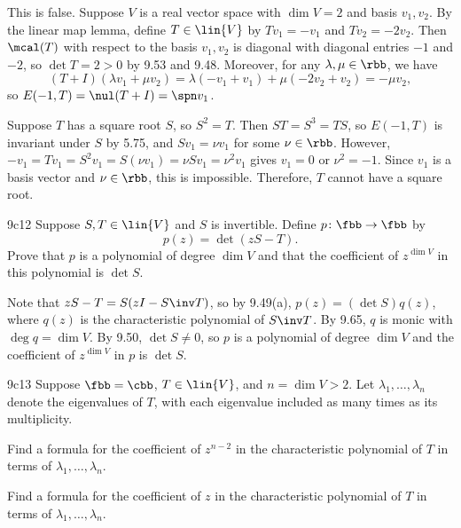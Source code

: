 \begin{sol}
    This is false.
    Suppose $V$ is a real vector space with $\dim V = 2$ and basis $v_1, v_2$.
    By the linear map lemma, define $T \in \lin{V}$ by $T v_1 = -v_1$ and $T v_2 = -2 v_2$.
    Then $\mcal(T)$ with respect to the basis $v_1, v_2$ is diagonal with diagonal entries $-1$ and $-2$, so $\det T = 2 > 0$ by 9.53 and 9.48.
    Moreover, for any $\lambda, \mu \in \rbb$, we have
    \[
        (T + I)(\lambda v_1 + \mu v_2) = \lambda ( -v_1 + v_1) + \mu (-2 v_2 + v_2) = -\mu v_2,
    \]
    so $E(-1, T) = \nul(T + I) = \spn v_1$.

    Suppose $T$ has a square root $S$, so $S^2 = T$.
    Then $S T = S^3 = T S$, so $E(-1, T)$ is invariant under $S$ by 5.75, and $S v_1 = \nu v_1$ for some $\nu \in \rbb$.
    However, $- v_1 = T v_1 = S^2 v_1 = S(\nu v_1) = \nu S v_1 = \nu^2 v_1$ gives $v_1 = 0$ or $\nu^2 = -1$.
    Since $v_1$ is a basis vector and $\nu \in \rbb$, this is impossible.
    Therefore, $T$ cannot have a square root.
\end{sol}

\begin{exercise}{9c12}
    Suppose $S, T \in \lin{V}$ and $S$ is invertible.
    Define $p \colon \fbb \to \fbb$ by
    \[
        p(z) = \det(zS - T).
    \]
    Prove that $p$ is a polynomial of degree $\dim V$ and that the coefficient of $z^{\dim V}$ in this polynomial is $\det S$.
\end{exercise}

\begin{sol}
    Note that $z S - T = S(z I - S\inv T)$, so by 9.49(a), $p(z) = (\det S) q(z)$, where $q(z)$ is the characteristic polynomial of $S\inv T$.
    By 9.65, $q$ is monic with $\deg q = \dim V$.
    By 9.50, $\det S \neq 0$, so $p$ is a polynomial of degree $\dim V$ and the coefficient of $z^{\dim V}$ in $p$ is $\det S$.
\end{sol}

\begin{exercise}{9c13}
    Suppose $\fbb = \cbb$, $T \in \lin{V}$, and $n = \dim V > 2$.
    Let $\lambda_1, \ldots, \lambda_n$ denote the eigenvalues of $T$, with each eigenvalue included as many times as its multiplicity.
    \begin{subexercises}
        \item Find a formula for the coefficient of $z^{n-2}$ in the characteristic polynomial of $T$ in terms of $\lambda_1, \ldots, \lambda_n$.
        \item Find a formula for the coefficient of $z$ in the characteristic polynomial of $T$ in terms of $\lambda_1, \ldots, \lambda_n$.
    \end{subexercises}
\end{exercise}

